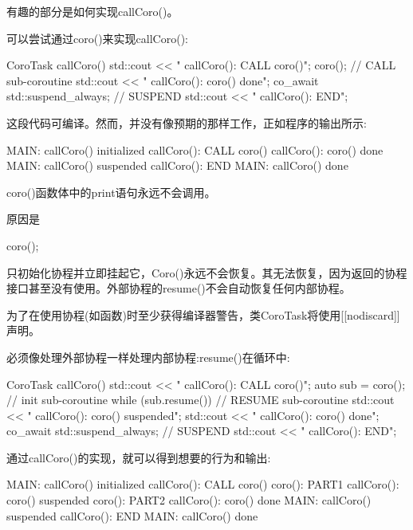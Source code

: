 有趣的部分是如何实现callCoro()。


可以尝试通过coro()来实现callCoro():

\begin{cpp}
CoroTask callCoro()
{
	std::cout << " callCoro(): CALL coro()\n";
	coro(); // CALL sub-coroutine
	std::cout << " callCoro(): coro() done\n";
	co_await std::suspend_always{}; // SUSPEND
	std::cout << " callCoro(): END\n";
}
\end{cpp}

这段代码可编译。然而，并没有像预期的那样工作，正如程序的输出所示:

\begin{shell}
MAIN: callCoro() initialized
  callCoro(): CALL coro()
  callCoro(): coro() done
MAIN: callCoro() suspended
  callCoro(): END
MAIN: callCoro() done
\end{shell}

coro()函数体中的print语句永远不会调用。

原因是

\begin{cpp}
coro();
\end{cpp}

只初始化协程并立即挂起它，Coro()永远不会恢复。其无法恢复，因为返回的协程接口甚至没有使用。外部协程的resume()不会自动恢复任何内部协程。

为了在使用协程(如函数)时至少获得编译器警告，类CoroTask将使用[[nodiscard]]声明。


必须像处理外部协程一样处理内部协程:resume()在循环中:

\begin{cpp}
CoroTask callCoro()
{
	std::cout << " callCoro(): CALL coro()\n";
	auto sub = coro(); // init sub-coroutine
	while (sub.resume()) { // RESUME sub-coroutine
		std::cout << " callCoro(): coro() suspended\n";
	}
	std::cout << " callCoro(): coro() done\n";
	co_await std::suspend_always{}; // SUSPEND
	std::cout << " callCoro(): END\n";
}
\end{cpp}

通过callCoro()的实现，就可以得到想要的行为和输出:

\begin{shell}
MAIN: callCoro() initialized
  callCoro(): CALL coro()
    coro(): PART1
  callCoro(): coro() suspended
    coro(): PART2
  callCoro(): coro() done
MAIN: callCoro() suspended
  callCoro(): END
MAIN: callCoro() done
\end{shell}

